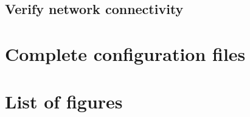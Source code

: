 \documentclass[a4paper]{article}
\begin{document}
\subsection{Verify network connectivity}

\newpage
\section{Complete configuration files}
\begin{multicols}{2}
\end{multicols}
\newpage
\section{List of figures}

\listoffigures
\end{document}

